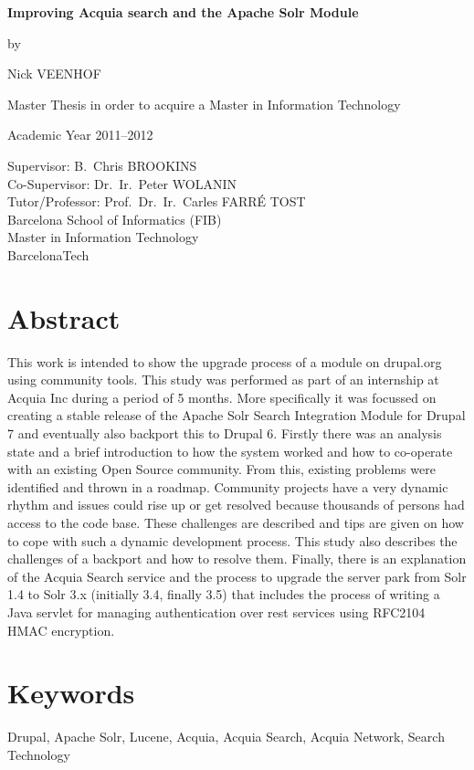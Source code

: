 
\newpage
{
\setlength{\baselineskip}{14pt}
\setlength{\parindent}{0pt}
\setlength{\parskip}{8pt}

\begin{center}

\noindent \textbf{\huge Improving Acquia search and the Apache Solr Module\\[8pt]}


by 

Nick VEENHOF

Master Thesis in order to acquire a Master in Information Technology

Academic Year 2011--2012

Supervisor: B.~Chris BROOKINS\\
Co-Supervisor: Dr.~Ir.~Peter WOLANIN\\
Tutor/Professor: Prof.~Dr.~Ir.~Carles FARR\'{E} TOST\\

Barcelona School of Informatics (FIB)\\
Master in Information Technology\\
BarcelonaTech

\end{center}

\section*{Abstract}


This work is intended to show the upgrade process of a module on drupal.org using community tools. This study was performed as part of an internship at Acquia Inc during a period of 5 months. More specifically it was focussed on creating a stable release of the Apache Solr Search Integration Module for Drupal 7 and eventually also backport this to Drupal 6. 
Firstly there was  an analysis state and a brief introduction to how the system worked and how to co-operate with an existing Open Source community. From this, existing problems were identified and thrown in a roadmap. Community projects have a very dynamic rhythm and issues could rise up or get resolved because thousands of persons had access to the code base. These challenges are described and tips are given on how to cope with such a dynamic development process.
This study also describes the challenges of a backport and how to resolve them. 
Finally, there is an explanation of the Acquia Search service and the process to upgrade the server park from Solr 1.4 to Solr 3.x (initially 3.4, finally 3.5) that includes the process of writing a Java servlet for managing authentication over rest services using RFC2104 HMAC encryption.

\section*{Keywords}
Drupal, Apache Solr, Lucene, Acquia, Acquia Search, Acquia Network, Search Technology
}

\newpage %
